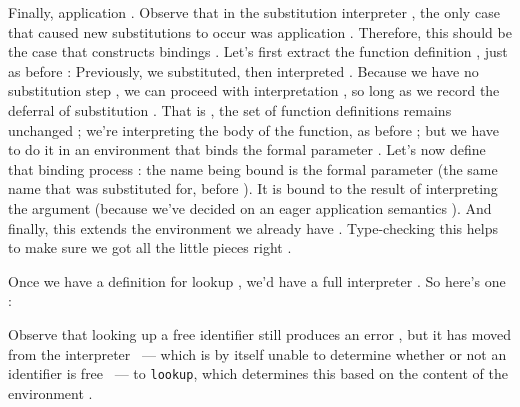 Finally, application . Observe that in the
substitution interpreter , the only case that caused new substitutions to occur was
application . Therefore, this should be the case that constructs bindings
. Let’s first
extract the function definition , just as before :
Previously, we substituted, then interpreted . Because we have no substitution step , we can proceed with interpretation , so long as we record the deferral of
substitution .
That is , the set of function definitions remains unchanged
; we’re interpreting the
body of the function, as before ; but we have to do it in an environment that binds the formal parameter
. Let’s now
define that binding process :
the name being bound is the formal parameter  (the same name that was substituted for, before ). It is bound to the result of interpreting the
argument  (because we’ve
decided on an eager application semantics ). And finally, this extends the environment we
already have .
Type-checking this helps to make sure  we got all the little pieces right .

Once we have a definition for lookup , we’d have a full interpreter .
So here’s one :

Observe that looking up a free identifier still produces an error , but it
has moved from the interpreter \ ---
which is by itself unable to determine whether or not an identifier is free
\ ---
to  \verb|lookup|, which determines this based on the content of the
environment .

